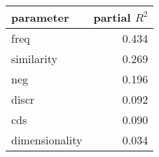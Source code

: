 \begin{tabular}{lr}
\toprule
      parameter &  partial $R^2$ \\
\midrule
           freq &   0.434 \\
     similarity &   0.269 \\
            neg &   0.196 \\
          discr &   0.092 \\
            cds &   0.090 \\
 dimensionality &   0.034 \\
\bottomrule
\end{tabular}
